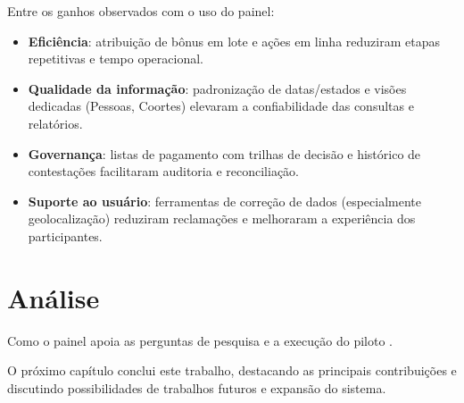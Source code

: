 Entre os ganhos observados com o uso do painel:
\begin{itemize}
  \item \textbf{Eficiência}: atribuição de bônus em lote e ações em linha
        reduziram etapas repetitivas e tempo operacional.
  \item \textbf{Qualidade da informação}: padronização de datas/estados e
        visões dedicadas (Pessoas, Coortes) elevaram a confiabilidade das
        consultas e relatórios.
  \item \textbf{Governança}: listas de pagamento com trilhas de decisão e
        histórico de contestações facilitaram auditoria e reconciliação.
  \item \textbf{Suporte ao usuário}: ferramentas de correção de dados
        (especialmente geolocalização) reduziram reclamações e melhoraram a
        experiência dos participantes.
\end{itemize}


\section{Análise}
\label{sec:analise}
Como o painel apoia as perguntas de pesquisa e a execução do piloto \citep{interscity:pilotoBikeSP}.

O próximo capítulo conclui este trabalho, destacando as principais contribuições e discutindo possibilidades de trabalhos futuros e expansão do sistema.



